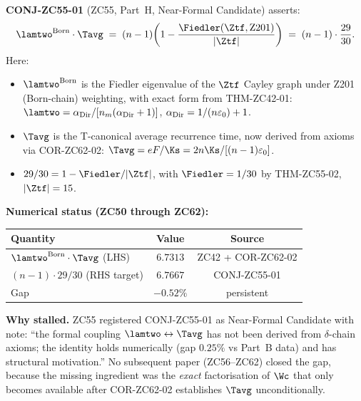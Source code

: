 \documentclass[12pt, a4paper]{article}
\begin{document}
\begin{keybox}[title={What CONJ-ZC55-01 States and Why It Stalled}]
\textbf{CONJ-ZC55-01} (ZC55, Part~H, Near-Formal Candidate) asserts:
\begin{equation}
  \lamtwo^{\rm Born}\cdot\Tavg
  \;=\;
  (n-1)\!\left(1 - \frac{\Fiedler(\Ztf,\mathrm{Z201})}{|\Ztf|}\right)
  \;=\;
  (n-1)\cdot\frac{29}{30}.
  \label{eq:conj5501}
\end{equation}
Here:
\begin{itemize}[leftmargin=2em, noitemsep]
  \item $\lamtwo^{\rm Born}$ is the Fiedler eigenvalue of the
    $\Ztf$ Cayley graph under Z201 (Born-chain) weighting,
    with exact form from THM-ZC42-01:
    $\lamtwo = \alpha_{\rm Dir}/[n_m(\alpha_{\rm Dir}+1)]$,
    $\alpha_{\rm Dir} = 1/(n\varepsilon_0)+1$.
  \item $\Tavg$ is the T-canonical average recurrence time,
    now derived from axioms via COR-ZC62-02:
    $\Tavg = eF/\Ks = 2n\Ks/[(n-1)\varepsilon_0]$.
  \item $29/30 = 1-\Fiedler/|\Ztf|$, with
    $\Fiedler = 1/30$ by THM-ZC55-02, $|\Ztf|=15$.
\end{itemize}

\medskip
\textbf{Numerical status (ZC50 through ZC62):}
\begin{center}
\begin{tabular}{@{}lcc@{}}
\toprule
Quantity & Value & Source \\
\midrule
$\lamtwo^{\rm Born}\cdot\Tavg$ (LHS) & $6.7313$ & ZC42 + COR-ZC62-02 \\
$(n-1)\cdot29/30$ (RHS target) & $6.7667$ & CONJ-ZC55-01 \\
Gap & $-0.52\%$ & persistent \\
\bottomrule
\end{tabular}
\end{center}

\medskip
\textbf{Why stalled.}
ZC55 registered CONJ-ZC55-01 as Near-Formal Candidate with note:
``the formal coupling $\lamtwo \leftrightarrow \Tavg$ has not been
derived from $\delta$-chain axioms; the identity holds numerically
(gap $0.25\%$ vs Part~B data) and has structural motivation.''
No subsequent paper (ZC56--ZC62) closed the gap, because
the missing ingredient was the \emph{exact} factorisation
of $\Wc$ that only becomes available after COR-ZC62-02
establishes $\Tavg$ unconditionally.
\end{keybox}

\end{document}
